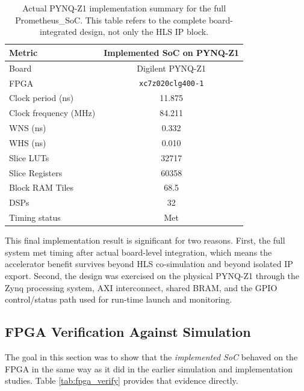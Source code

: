 \documentclass[11pt]{article}
\begin{document}
\begin{table}[ht]
\centering
\caption{Actual PYNQ-Z1 implementation summary for the full Prometheus\_SoC. This table refers to the complete board-integrated design, not only the HLS IP block.}
\label{tab:fpga_soc}
\begin{tabular}{lc}
\toprule
Metric & Implemented SoC on PYNQ-Z1 \\
\midrule
Board & Digilent PYNQ-Z1 \\
FPGA & \texttt{xc7z020clg400-1} \\
Clock period (ns) & 11.875 \\
Clock frequency (MHz) & 84.211 \\
WNS (ns) & 0.332 \\
WHS (ns) & 0.010 \\
Slice LUTs & 32717 \\
Slice Registers & 60358 \\
Block RAM Tiles & 68.5 \\
DSPs & 32 \\
Timing status & Met \\
\bottomrule
\end{tabular}
\end{table}

This final implementation result is significant for two reasons. First, the full system met timing after actual board-level integration, which means the accelerator benefit survives beyond HLS co-simulation and beyond isolated IP export. Second, the design was exercised on the physical PYNQ-Z1 through the Zynq processing system, AXI interconnect, shared BRAM, and the GPIO control/status path used for run-time launch and monitoring.

\subsection{FPGA Verification Against Simulation}
The goal in this section was to show that the \emph{implemented SoC} behaved on the FPGA in the same way as it did in the earlier simulation and implementation studies. 
Table \ref{tab:fpga_verify} provides that evidence directly.
\end{document}

